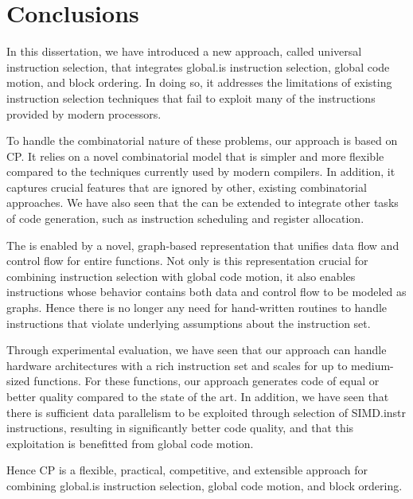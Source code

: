 %

\chapter{Conclusions}

In this dissertation, we have introduced a new approach, called \gls{universal
  instruction selection}, that integrates \gls{global.is} \gls{instruction
  selection}, \gls{global code motion}, and \gls{block ordering}.
%
In doing so, it addresses the limitations of existing \gls{instruction
  selection} techniques that fail to exploit many of the \glspl{instruction}
provided by modern processors.

To handle the combinatorial nature of these problems, our approach is based on
\glsdesc{CP}.
%
It relies on a novel combinatorial model that is simpler and more flexible
compared to the techniques currently used by modern \glspl{compiler}.
%
In addition, it captures crucial features that are ignored by other, existing
combinatorial approaches.
%
We have also seen that the  can be extended to
integrate other tasks of \gls{code generation}, such as \gls{instruction
  scheduling} and \gls{register allocation}.

The  is enabled by a novel, \gls{graph}-based
representation that unifies data flow and control flow for entire
\glspl{function}.
%
Not only is this representation crucial for combining \gls{instruction
  selection} with \gls{global code motion}, it also enables \glspl{instruction}
whose behavior contains both data and control flow to be modeled as
\glspl{graph}.
%
Hence there is no longer any need for hand-written routines to handle
\glspl{instruction} that violate underlying assumptions about the
\gls{instruction set}.

Through experimental evaluation, we have seen that our approach can handle
hardware architectures with a rich \gls{instruction set} and scales for up to
medium-sized \glspl{function}.
%
For these \glspl{function}, our approach generates code of equal or better
quality compared to the state of the art.
%
In addition, we have seen that there is sufficient data parallelism to be
exploited through selection of \gls{SIMD.instr} \glspl{instruction}, resulting
in significantly better code quality, and that this exploitation is benefitted
from \gls{global code motion}.

Hence \glsdesc{CP} is a flexible, practical, competitive, and extensible
approach for combining \gls{global.is} \gls{instruction selection}, \gls{global
  code motion}, and \gls{block ordering}.
